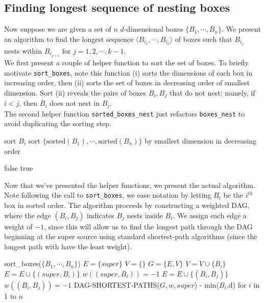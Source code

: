 \documentclass[paper=a4, fontsize=11pt]{scrartcl} %
\numberwithin{equation}{section} %
\numberwithin{figure}{section} %
\numberwithin{table}{section} %
\begin{document}
\subsection{Finding longest sequence of nesting boxes}

Now suppose we are given a set of $n$ $d$-dimensional boxes $\{B_1, \cdots, B_n\}$. We present an algorithm to find the longest sequence $\langle B_{i_1}, \cdots, B_{i_k}\rangle$ of boxes such that $B_{i_j}$ nests within $B_{i_{j+1}}$ for $j = 1, 2, \cdots, k-1$. \\

We first present a couple of helper function to sort the set of boxes. To briefly motivate \texttt{sort\_boxes}, note this function (i) sorts the dimensions of each box in increasing order, then (ii) sorts the set of boxes in decreasing order of smallest dimension. Sort (ii) reveals the pairs of boxes $B_i, B_j$ that do not nest; namely, if $i < j$, then $B_i$ does not nest in $B_j$. \\

The second helper function \texttt{sorted\_boxes\_nest} just refactors \texttt{boxes\_nest} to avoid duplicating the sorting step.

\begin{algorithmic}
		\State sort $B_i$
	\EndFor
	sort $\{\textrm{sorted}(B_1), \cdots, \textrm{sorted}(B_n)\}$ by smallest dimension in decreasing order
\EndFunction
\end{algorithmic}

\begin{algorithmic}
			\State \Return false 
		\EndIf
	\EndFor
	\State \Return true
	\EndFunction
\end{algorithmic}

Now that we've presented the helper functions, we present the actual algorithm. Note following the call to \texttt{sort\_boxes}, we ease notation by letting $B_i$ be the $i^{th}$ box in sorted order. The algorithm proceeds by constructing a weighted DAG, where the edge $(B_i, B_j)$ indicates $B_j$ nests inside $B_i$. We assign each edge a weight of $-1$, since this will allow us to find the longest path through the DAG beginning at the super source using standard shortest-path algorithms (since the longest path with have the least weight).

\begin{algorithmic}[1]
	\State sort\_boxes($\{B_1, \cdots, B_n\}$)
	\State $E = \{super\}$
	\State $V = \{\}$
	\State $G = \{E,V\}$
		\State $V = V \cup \{B_i\}$
		\State $E = E \cup \{(super, B_i)\}$
		\State $w((super, B_i)) = -1$
		 
				\State $E = E \cup \{(B_i, B_j)\}$
				\State $w((B_i, B_j)) = -1$
			\EndIf
		\EndFor
	\EndFor
	\State DAG-SHORTEST-PATHS($G, w, super$)
	\State \Return - min($B_i$.d) for $i$ in 1 to $n$ 
	\EndFunction
\end{algorithmic}
\end{document}
